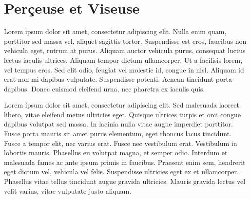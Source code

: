 \section{Perçeuse et Viseuse}
Lorem ipsum dolor sit amet, consectetur adipiscing elit. Nulla enim quam, porttitor sed massa vel, aliquet sagittis tortor. Suspendisse est eros, faucibus non vehicula eget, rutrum at purus. Aliquam auctor vehicula purus, consequat luctus lectus iaculis ultrices. Aliquam tempor dictum ullamcorper. Ut a facilisis lorem, vel tempus eros. Sed elit odio, feugiat vel molestie id, congue in nisl. Aliquam id erat non mi dapibus vulputate. Suspendisse potenti. Aenean tincidunt porta dapibus. Donec euismod eleifend urna, nec pharetra ex iaculis quis.

Lorem ipsum dolor sit amet, consectetur adipiscing elit. Sed malesuada laoreet libero, vitae eleifend metus ultricies eget. Quisque ultrices turpis et orci congue dapibus volutpat sed massa. In lacinia nulla vitae augue imperdiet porttitor. Fusce porta mauris sit amet purus elementum, eget rhoncus lacus tincidunt. Fusce a tempor elit, nec varius erat. Fusce nec vestibulum erat. Vestibulum in lobortis mauris. Phasellus eu volutpat magna, et semper odio. Interdum et malesuada fames ac ante ipsum primis in faucibus. Praesent enim sem, hendrerit eget dictum vel, vehicula vel felis. Suspendisse ultricies eget ex et ullamcorper. Phasellus vitae tellus tincidunt augue gravida ultricies. Mauris gravida lectus vel velit varius, vitae vulputate justo aliquam.
